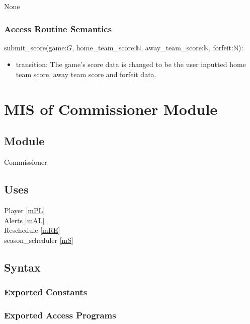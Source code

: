 \documentclass[12pt, titlepage]{article}
\begin{document}
None

\subsubsection{Access Routine Semantics}

\noindent submit\_score(game:$G$, home\_team\_score:$\mathbb{N}$, away\_team\_score:$\mathbb{N}$, forfeit:$\mathbb{N}$):
\begin{itemize}
\item transition: The game's score data is changed to be the user inputted
home team score, away team score and forfeit data.
\end{itemize}

\newpage

\section{MIS of Commissioner Module} \label{mCM}

\subsection{Module}

Commissioner

\subsection{Uses}

Player \ref{mPL}\\
Alerts \ref{mAL}\\
Reschedule \ref{mRE}\\
season\_scheduler \ref{mS}

\subsection{Syntax}

\subsubsection{Exported Constants}

\subsubsection{Exported Access Programs}
\end{document}
